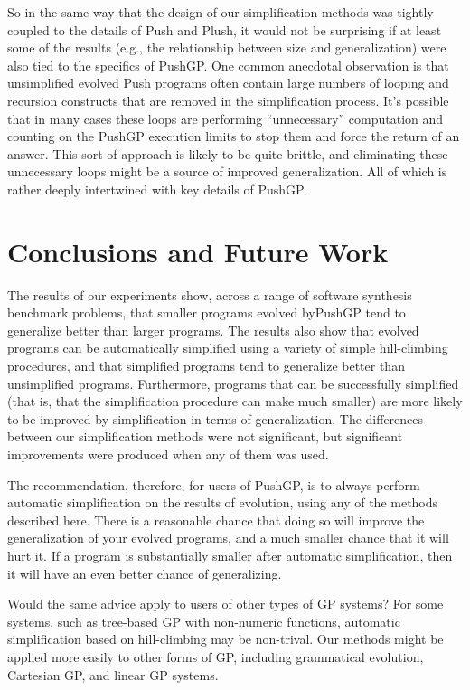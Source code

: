 So in the same way that the design of our simplification methods was
tightly coupled to the details of Push and Plush, it would not be surprising
if at least some of the results (e.g., the relationship between size and
generalization) were also tied to the specifics of PushGP. One common
anecdotal observation is that unsimplified evolved Push programs often
contain large numbers of looping and recursion constructs that are removed
in the simplification process. It's possible that in many cases these loops
are performing ``unnecessary'' computation and counting on the PushGP
execution limits to stop them and force the return of an answer. This sort
of approach is likely to be quite brittle, and eliminating these unnecessary
loops might be a source of improved generalization. All of which is rather
deeply intertwined with key details of PushGP.



\section{Conclusions and Future Work}
\label{sec:conclusions}

The results of our experiments show, across a range of software synthesis benchmark problems, that smaller programs evolved byPushGP tend to generalize better than larger programs. The results also show that evolved programs can be automatically simplified using a variety of simple hill-climbing procedures, and that simplified programs tend to generalize better than unsimplified programs. Furthermore, programs that can be successfully simplified (that is, that the simplification procedure can make much smaller) are more likely to be improved by simplification in terms of generalization. The differences between our simplification methods were not significant, but significant improvements were produced when any of them was used.

The recommendation, therefore, for users of PushGP, is to always perform automatic simplification on the results of evolution, using any of the methods described here. There is a reasonable chance that doing so will improve the generalization of your evolved programs, and a much smaller chance that it will hurt it. If a program is substantially smaller after automatic simplification, then it will have an even better chance of generalizing.

Would the same advice apply to users of other types of GP systems? For some systems, such as tree-based GP with non-numeric functions, automatic simplification based on hill-climbing may be non-trival. Our methods might be applied more easily to other forms of GP, including grammatical evolution, Cartesian GP, and linear GP systems.

